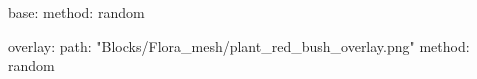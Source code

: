 base:
  method: random
  
overlay:
  path: "Blocks/Flora_mesh/plant_red_bush_overlay.png"
  method: random